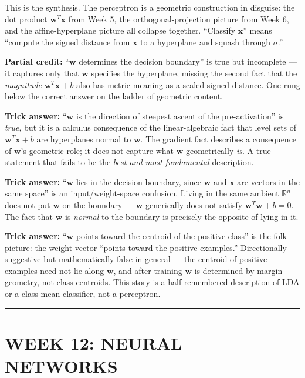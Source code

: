 \documentclass[12pt]{amsart}
\newcommand{\divider}{
  \vspace{-1em}
  \noindent
  \raisebox{-0.15ex}{\textbullet}%
  \hspace{0.5em}%
  \rule[0.5ex]{0.95\textwidth}{1.0pt}%
  \hspace{0.5em}%
  \raisebox{-0.15ex}{\textbullet}%
  \vspace{0em}
}
\begin{document}
This is the synthesis. The perceptron is a geometric construction in
disguise: the dot product $\mathbf{w}^T \mathbf{x}$ from Week 5, the
orthogonal-projection picture from Week 6, and the affine-hyperplane
picture all collapse together. ``Classify $\mathbf{x}$'' means ``compute
the signed distance from $\mathbf{x}$ to a hyperplane and squash through
$\sigma$.''

\textbf{Partial credit:}
``$\mathbf{w}$ determines the decision boundary'' is true but
incomplete --- it captures only that $\mathbf{w}$ specifies the
hyperplane, missing the second fact that the \emph{magnitude}
$\mathbf{w}^T \mathbf{x} + b$ also has metric meaning as a scaled
signed distance. One rung below the correct answer on the ladder of
geometric content.

\textbf{Trick answer:}
``$\mathbf{w}$ is the direction of steepest ascent of the pre-activation''
is \emph{true}, but it is a calculus consequence of the linear-algebraic
fact that level sets of $\mathbf{w}^T \mathbf{x} + b$ are hyperplanes
normal to $\mathbf{w}$. The gradient fact describes a consequence of
$\mathbf{w}$'s geometric role; it does not capture what $\mathbf{w}$
geometrically \emph{is}. A true statement that fails to be the
\emph{best and most fundamental} description.

\textbf{Trick answer:}
``$\mathbf{w}$ lies in the decision boundary, since $\mathbf{w}$ and
$\mathbf{x}$ are vectors in the same space'' is an input/weight-space
confusion. Living in the same ambient $\mathbb{R}^n$ does not put
$\mathbf{w}$ on the boundary --- $\mathbf{w}$ generically does not
satisfy $\mathbf{w}^T \mathbf{w} + b = 0$. The fact that $\mathbf{w}$ is
\emph{normal} to the boundary is precisely the opposite of lying in it.

\textbf{Trick answer:}
``$\mathbf{w}$ points toward the centroid of the positive class'' is the
folk picture: the weight vector ``points toward the positive examples.''
Directionally suggestive but mathematically false in general --- the
centroid of positive examples need not lie along $\mathbf{w}$, and after
training $\mathbf{w}$ is determined by margin geometry, not class
centroids. This story is a half-remembered description of LDA or a
class-mean classifier, not a perceptron.

\divider

\section*{WEEK 12: NEURAL NETWORKS}
\end{document}
